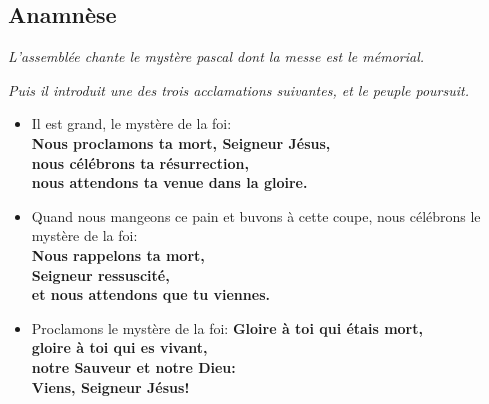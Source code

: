 \subsection*{Anamnèse}

\emph{L'assemblée chante le mystère pascal dont la messe est le mémorial.}

\emph{Puis il introduit une des trois acclamations suivantes, et le peuple poursuit.}

\begin{itemize}
\item  Il est grand, le mystère de la foi:\\
{\bf Nous proclamons ta mort, Seigneur Jésus,\\
nous célébrons ta résurrection,\\
nous attendons ta venue dans la gloire.}

\item Quand nous mangeons ce pain
et buvons à cette coupe,
nous célébrons le mystère de la foi:\\
{\bf Nous rappelons ta mort,\\
Seigneur ressuscité,\\
et nous attendons que tu viennes.}

\item Proclamons le mystère de la foi:
{\bf Gloire à toi qui étais mort,\\
gloire à toi qui es vivant,\\
notre Sauveur et notre Dieu:\\
Viens, Seigneur Jésus!}

\end{itemize}
